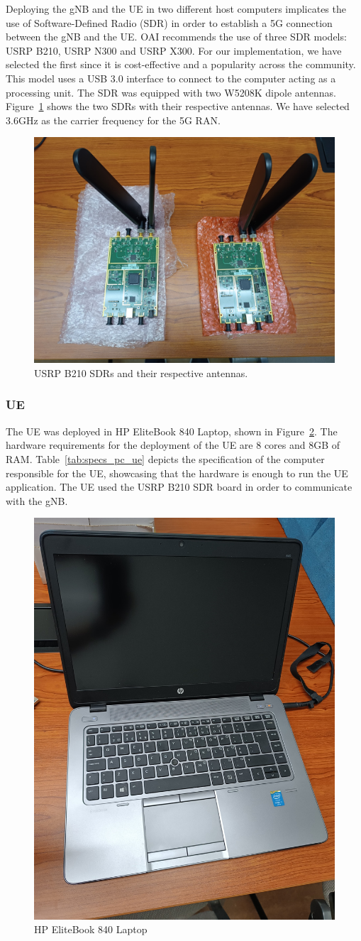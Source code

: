 Deploying the gNB and the UE in two different host computers implicates the use of Software-Defined Radio (SDR) in order to establish a 5G connection between the gNB and the UE\@.
OAI recommends the use of three SDR models: USRP B210, USRP N300 and USRP X300\@ \cite{openairinterface_tutorial}.
For our implementation, we have selected the first since it is cost-effective and a popularity across the community.
This model uses a USB 3.0 interface to connect to the computer acting as a processing unit.
The SDR was equipped with two W5208K dipole antennas.
Figure~\ref{fig:SDRs} shows the two SDRs with their respective antennas.
We have selected 3.6GHz as the carrier frequency for the 5G RAN\@.

\begin{figure}[H]
    \centering
    \includegraphics[width=0.5\linewidth]{figures/SDRs}
    \caption{USRP B210 SDRs and their respective antennas.}
    \label{fig:SDRs}
\end{figure}



\subsubsection{UE}
The UE was deployed in HP EliteBook 840 Laptop, shown in Figure~\ref{fig:computer_hp}.
The hardware requirements for the deployment of the UE are 8 cores and 8GB of RAM\@.
Table~\ref{tab:specs_pc_ue} depicts the specification of the computer responsible for the UE\@, showcasing that the hardware is enough to run the UE application.
The UE used the USRP B210 SDR board in order to communicate with the gNB\@.

\begin{figure}[H]
    \centering
    \includegraphics[width=0.3\linewidth]{figures/hp}
    \caption{HP EliteBook 840 Laptop}
    \label{fig:computer_hp}
\end{figure}

